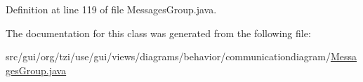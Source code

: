 Definition at line 119 of file Messages\-Group.\-java.



The documentation for this class was generated from the following file\-:\begin{DoxyCompactItemize}
\item 
src/gui/org/tzi/use/gui/views/diagrams/behavior/communicationdiagram/\hyperlink{_messages_group_8java}{Messages\-Group.\-java}\end{DoxyCompactItemize}
